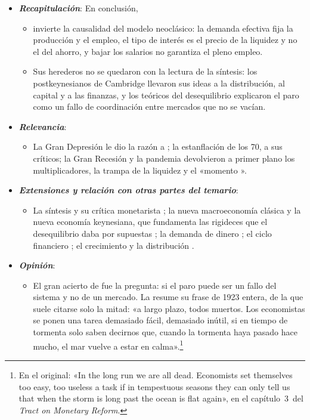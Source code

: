 \documentclass[11pt]{article}
\begin{document}
\begin{itemize}
\item \textbf{\emph{Recapitulación}}: En conclusión,
  \begin{itemize}
  \item {} invierte la causalidad del modelo neoclásico: la demanda efectiva fija la producción y el empleo, el tipo de interés es el precio de la liquidez y no el del ahorro, y bajar los salarios no garantiza el pleno empleo.

  \item Sus herederos no se quedaron con la lectura de la síntesis: los postkeynesianos de Cambridge llevaron sus ideas a la distribución, al capital y a las finanzas, y los teóricos del desequilibrio explicaron el paro como un fallo de coordinación entre mercados que no se vacían.
  \end{itemize}
\item \textbf{\emph{Relevancia}}:
  \begin{itemize}
  \item La Gran Depresión le dio la razón a ; la estanflación de los 70, a sus críticos; la Gran Recesión y la pandemia devolvieron a primer plano los multiplicadores, la trampa de la liquidez y el «momento ».
  \end{itemize}
\item \textbf{\emph{Extensiones y relación con otras partes del temario}}:
  \begin{itemize}
  \item La síntesis y su crítica monetarista ; la nueva macroeconomía clásica  y la nueva economía keynesiana, que fundamenta las rigideces que el desequilibrio daba por supuestas ; la demanda de dinero ; el ciclo financiero ; el crecimiento y la distribución  .
  \end{itemize}
\item \textbf{\emph{Opinión}}:
  \begin{itemize}
  \item El gran acierto de  fue la pregunta: si el paro puede ser un fallo del sistema y no de un mercado. La resume su frase de 1923 entera, de la que suele citarse solo la mitad: «a largo plazo, todos muertos. Los economistas se ponen una tarea demasiado fácil, demasiado inútil, si en tiempo de tormenta solo saben decirnos que, cuando la tormenta haya pasado hace mucho, el mar vuelve a estar en calma».\footnote{En el original: «In the long run we are all dead. Economists set themselves too easy, too useless a task if in tempestuous seasons they can only tell us that when the storm is long past the ocean is flat again», en el capítulo~3~del \emph{Tract on Monetary Reform}\nocite{Keynes1923Tract}.}


\end{itemize}
\end{itemize}
\end{document}
